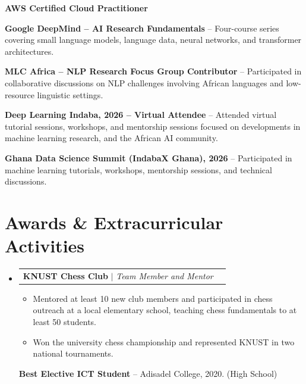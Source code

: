 \documentclass[letterpaper,10pt]{article}
\makeatletter
\newcommand{\resumeItem}[1]{
  \item\small{#1}
}
\newcommand{\resumeProjectHeading}[2]{
  \item
  \begin{tabular*}{0.98\textwidth}
    {l@{\extracolsep{\fill}}r}
    \small #1 & #2 \\
  \end{tabular*}
  \vspace{-3pt}
}
\newcommand{\resumeSubHeadingListStart}{
  \begin{itemize}[leftmargin=0.12in,label={},itemsep=3pt,topsep=3pt]
}
\newcommand{\resumeSubHeadingListEnd}{
  \end{itemize}\vspace{-3pt}
}
\newcommand{\resumeItemListStart}{
  \begin{itemize}[leftmargin=0.20in,label=\textbullet,itemsep=2pt,parsep=0pt,topsep=3pt]
}
\newcommand{\resumeItemListEnd}{
  \end{itemize}\vspace{-3pt}
}
\makeatother
\begin{document}
\begin{itemize}[leftmargin=0.20in,label=\textbullet,itemsep=2pt,topsep=3pt]
  \small{
    \item{
      \textbf{AWS Certified Cloud Practitioner}
    }

    \item{
      \textbf{Google DeepMind -- AI Research Fundamentals}
      -- Four-course series covering small language models,
      language data, neural networks, and
      transformer architectures.
    }

    \item{
      \textbf{MLC Africa -- NLP Research Focus Group Contributor}
      -- Participated in collaborative discussions
      on NLP challenges involving African languages
      and low-resource linguistic settings.
    }

    \item{
      \textbf{Deep Learning Indaba, 2026 -- Virtual Attendee}
      -- Attended virtual tutorial sessions, workshops, and mentorship sessions focused on
      developments in machine learning research,
      and the African AI community.
    }

    \item{
      \textbf{Ghana Data Science Summit (IndabaX Ghana), 2026}
      -- Participated in machine learning tutorials,
      workshops, mentorship sessions, and
      technical discussions.
    }
  }
\end{itemize}

\section{Awards \& Extracurricular Activities}

\resumeSubHeadingListStart
  \resumeProjectHeading
    {\textbf{KNUST Chess Club} $|$ \textit{Team Member and Mentor}}
    {}

  \resumeItemListStart
    \resumeItem{
      Mentored at least 10 new club members
      and participated in chess outreach at
      a local elementary school, teaching
      chess fundamentals to at least 50 students.
    }

    \resumeItem{
      Won the university chess championship
      and represented KNUST in two national
      tournaments.
    }
  \resumeItemListEnd

  \vspace{2pt}

  \small{
    \textbf{Best Elective ICT Student}
    -- Adisadel College, 2020. (High School)
  }
\resumeSubHeadingListEnd
\end{document}
